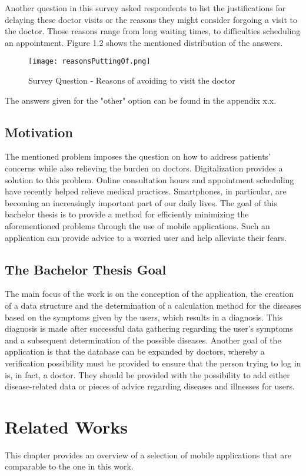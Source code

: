 \noindent 
Another question in this survey asked respondents to list the justifications for delaying these doctor visits or the reasons they might consider forgoing a visit to the doctor.
Those reasons range from long waiting times, to difficulties scheduling an appointment. Figure 1.2 shows the mentioned distribution of the answers.
\begin{figure}[H]
	\centering
	\texttt{[image: reasonsPuttingOf.png]}
	\caption[Survey Question]{Survey Question - Reasons of avoiding to visit the doctor}
\end{figure}
\noindent 
The answers given for the "other" option can be found in the appendix x.x.
\section{Motivation}
The mentioned problem imposes the question on how to address patients’ concerns while also relieving the burden on doctors. Digitalization provides a solution to this problem. Online consultation hours and appointment scheduling have recently helped relieve medical practices. Smartphones, in particular, are becoming an increasingly important part of our daily lives. The goal of this bachelor thesis is to provide a method for efficiently minimizing the aforementioned problems through the use of mobile applications. Such an application can provide advice to a worried user and help alleviate their fears.

\section{The Bachelor Thesis Goal}
The main focus of the work is on the conception of the application, the creation of a data structure and the determination of a calculation method for the diseases based on the symptoms given by the users, which results in a diagnosis. This diagnosis is made after successful data gathering regarding the user's symptoms and a subsequent determination of the possible diseases. Another goal of the application is that the database can be expanded by doctors, whereby a verification possibility must be provided to ensure that the person trying to log in is, in fact, a doctor. They should be provided with the possibility to add either disease-related data or pieces of advice regarding diseases and illnesses for users. 

\chapter{Related Works}
This chapter provides an overview of a selection of mobile applications that are comparable to the one in this work.

